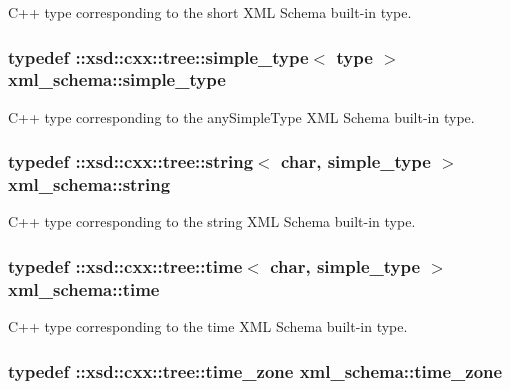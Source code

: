 C++ type corresponding to the short X\-M\-L Schema built-\/in type. 

\hypertarget{namespacexml__schema_a44789bb4367951bcf8ae867cb983324d}{
\subsubsection[{simple\-\_\-type}]{\setlength{\rightskip}{0pt plus 5cm}typedef \-::xsd\-::cxx\-::tree\-::simple\-\_\-type$<$ {\bf type} $>$ {\bf xml\-\_\-schema\-::simple\-\_\-type}}}\label{namespacexml__schema_a44789bb4367951bcf8ae867cb983324d}


C++ type corresponding to the any\-Simple\-Type X\-M\-L Schema built-\/in type. 

\hypertarget{namespacexml__schema_aefbaf353f9a0043af46d23d9040ef268}{
\subsubsection[{string}]{\setlength{\rightskip}{0pt plus 5cm}typedef \-::xsd\-::cxx\-::tree\-::string$<$ char, {\bf simple\-\_\-type} $>$ {\bf xml\-\_\-schema\-::string}}}\label{namespacexml__schema_aefbaf353f9a0043af46d23d9040ef268}


C++ type corresponding to the string X\-M\-L Schema built-\/in type. 

\hypertarget{namespacexml__schema_a75a88454d26d1fbbe712e22e9e994cee}{
\subsubsection[{time}]{\setlength{\rightskip}{0pt plus 5cm}typedef \-::xsd\-::cxx\-::tree\-::time$<$ char, {\bf simple\-\_\-type} $>$ {\bf xml\-\_\-schema\-::time}}}\label{namespacexml__schema_a75a88454d26d1fbbe712e22e9e994cee}


C++ type corresponding to the time X\-M\-L Schema built-\/in type. 

\hypertarget{namespacexml__schema_a8e57a44a0fd5762cb4132689a635d6c3}{
\subsubsection[{time\-\_\-zone}]{\setlength{\rightskip}{0pt plus 5cm}typedef \-::xsd\-::cxx\-::tree\-::time\-\_\-zone {\bf xml\-\_\-schema\-::time\-\_\-zone}}}\label{namespacexml__schema_a8e57a44a0fd5762cb4132689a635d6c3}


